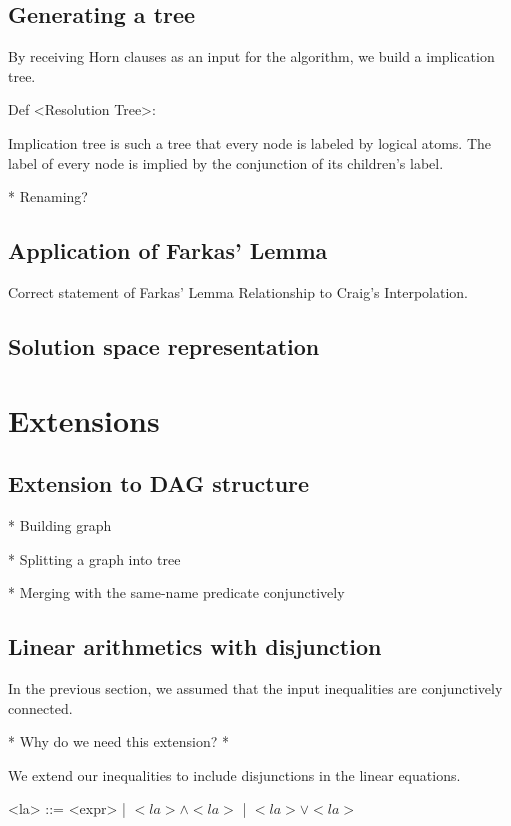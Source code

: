 \documentclass{llncs}
\begin{document}
\subsection{Generating a tree}

By receiving Horn clauses as an input for the algorithm, we build a
implication tree.

Def <Resolution Tree>:

Implication tree is such a tree that every node is labeled by logical
atoms. The label of every node is implied by the conjunction of its
children's label.


* Renaming?

\subsection{Application of Farkas' Lemma}

Correct statement of Farkas' Lemma
Relationship to Craig's Interpolation.

\subsection{Solution space representation}


\section{Extensions}

\subsection{Extension to DAG structure}

* Building graph

* Splitting a graph into tree

* Merging with the same-name predicate conjunctively

\subsection{Linear arithmetics with disjunction}

In the previous section, we assumed that the input inequalities are
conjunctively connected.

* Why do we need this extension? *

We extend our inequalities to include disjunctions in the linear
equations.

\setlength{\grammarindent}{2em}
\begin{grammar}
<la> ::= <expr> | $<la> \wedge <la>$ | $<la> \vee <la>$
\end{grammar}
\end{document}
